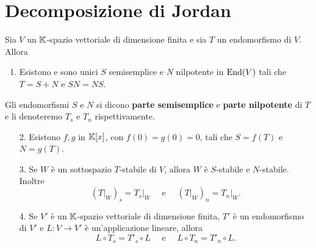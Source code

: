 















\section{Decomposizione di Jordan}
\begin{proposition}\label{PrDecomposizioneSemisempliceNilpotente}
    Sia $V$ un $\mathbb{K}$-spazio vettoriale di dimensione finita e sia $T$ un endomorfismo di $V$. Allora \begin{enumerate}
        \item Esistono e sono unici $S$ semisemplice e $N$ nilpotente in $\operatorname{End}(V)$ tali che $T=S+N$ e $SN=NS$.
    \end{enumerate}
    Gli endomorfismi $S$ e $N$ si dicono \textbf{parte semisemplice} e \textbf{parte nilpotente} di $T$ e li denoteremo $T_s$ e $T_n$ rispettivamente. 
    \begin{enumerate}
        \item[2.] Esistono $f,g$ in $\mathbb{K}[x]$, con $f(0)=g(0)=0$, tali che $S=f(T)$ e $N=g(T)$.
        \item[3.] Se $W$ è un sottospazio $T$-stabile di $V$, allora $W$ è $S$-stabile e $N$-stabile. Inoltre \[\left(\left.T\right|_{W}\right)_s=\left.T_s\right|_{W} \quad \text{ e } \quad \left(\left.T\right|_{W}\right)_n=\left.T_n\right|_{W}.\]
        \item[4.] Se $V'$ è un $\mathbb{K}$-spazio vettoriale di dimensione finita, $T'$ è un endomorfismo di $V'$ e $L\colon V \to V'$ è un'applicazione lineare, allora \[L\circ T_s = T'_s\circ L \quad \text{ e } \quad L\circ T_n = T'_n\circ L.\]
    \end{enumerate}
\end{proposition}

